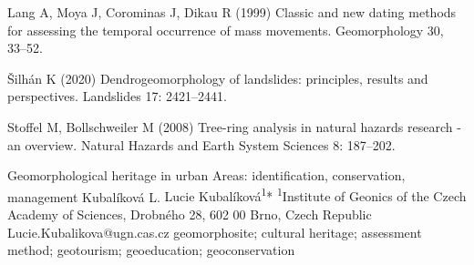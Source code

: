 {Lang A, Moya J, Corominas J, Dikau R (1999) Classic and new dating methods for assessing the temporal occurrence of mass movements. Geomorphology 30, 33–52.

Šilhán K (2020) Dendrogeomorphology of landslides: principles, results and perspectives. Landslides 17: 2421–2441. 

Stoffel M, Bollschweiler M (2008) Tree-ring analysis in natural hazards research - an overview. Natural Hazards and Earth System Sciences 8: 187–202.
}


\abstract
{Geomorphological heritage in urban Areas: identification, conservation, management} 
{Kubalíková L.} 
{Lucie Kubalíková\textsuperscript{1}*} 
{\TLtag} 
{
\textsuperscript{1}Institute of Geonics of the Czech Academy of Sciences, Drobného 28, 602 00 Brno, Czech Republic
}
{Lucie.Kubalikova@ugn.cas.cz}  %
{geomorphosite; cultural heritage; assessment method; geotourism; geoeducation; geoconservation}
